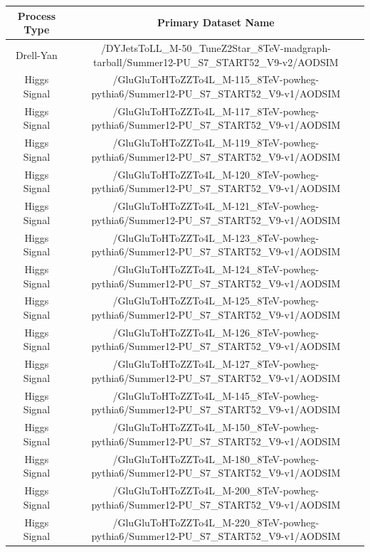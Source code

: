 \documentclass{cmspaper}
\begin{document}
\begin{table}[!ht]
\begin{center}
\begin{tabular}{|c|c|}
\hline
 Process Type                     & Primary Dataset Name                       \\

\hline 
Drell-Yan                & \footnotesize /DYJetsToLL\_M-50\_TuneZ2Star\_8TeV-madgraph-tarball/Summer12-PU\_S7\_START52\_V9-v2/AODSIM \\
\hline
Higgs Signal             & \footnotesize /GluGluToHToZZTo4L\_M-115\_8TeV-powheg-pythia6/Summer12-PU\_S7\_START52\_V9-v1/AODSIM \\
Higgs Signal             & \footnotesize /GluGluToHToZZTo4L\_M-117\_8TeV-powheg-pythia6/Summer12-PU\_S7\_START52\_V9-v1/AODSIM \\
Higgs Signal             & \footnotesize /GluGluToHToZZTo4L\_M-119\_8TeV-powheg-pythia6/Summer12-PU\_S7\_START52\_V9-v1/AODSIM \\
Higgs Signal             & \footnotesize /GluGluToHToZZTo4L\_M-120\_8TeV-powheg-pythia6/Summer12-PU\_S7\_START52\_V9-v1/AODSIM \\
Higgs Signal             & \footnotesize /GluGluToHToZZTo4L\_M-121\_8TeV-powheg-pythia6/Summer12-PU\_S7\_START52\_V9-v1/AODSIM \\
Higgs Signal             & \footnotesize /GluGluToHToZZTo4L\_M-123\_8TeV-powheg-pythia6/Summer12-PU\_S7\_START52\_V9-v1/AODSIM \\
Higgs Signal             & \footnotesize /GluGluToHToZZTo4L\_M-124\_8TeV-powheg-pythia6/Summer12-PU\_S7\_START52\_V9-v1/AODSIM \\
Higgs Signal             & \footnotesize /GluGluToHToZZTo4L\_M-125\_8TeV-powheg-pythia6/Summer12-PU\_S7\_START52\_V9-v1/AODSIM \\
Higgs Signal             & \footnotesize /GluGluToHToZZTo4L\_M-126\_8TeV-powheg-pythia6/Summer12-PU\_S7\_START52\_V9-v1/AODSIM \\
Higgs Signal             & \footnotesize /GluGluToHToZZTo4L\_M-127\_8TeV-powheg-pythia6/Summer12-PU\_S7\_START52\_V9-v1/AODSIM \\
Higgs Signal             & \footnotesize /GluGluToHToZZTo4L\_M-145\_8TeV-powheg-pythia6/Summer12-PU\_S7\_START52\_V9-v1/AODSIM \\
Higgs Signal             & \footnotesize /GluGluToHToZZTo4L\_M-150\_8TeV-powheg-pythia6/Summer12-PU\_S7\_START52\_V9-v1/AODSIM \\
Higgs Signal             & \footnotesize /GluGluToHToZZTo4L\_M-180\_8TeV-powheg-pythia6/Summer12-PU\_S7\_START52\_V9-v1/AODSIM \\
Higgs Signal             & \footnotesize /GluGluToHToZZTo4L\_M-200\_8TeV-powheg-pythia6/Summer12-PU\_S7\_START52\_V9-v1/AODSIM \\
Higgs Signal             & \footnotesize /GluGluToHToZZTo4L\_M-220\_8TeV-powheg-pythia6/Summer12-PU\_S7\_START52\_V9-v1/AODSIM \\


\end{tabular}
\end{center}
\end{table}
\end{document}
